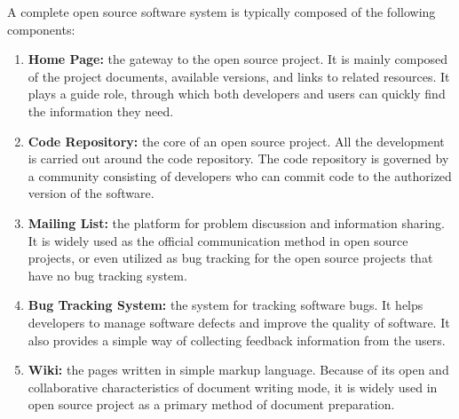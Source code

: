 \documentclass[draftclsnofoot,journal,onecolumn,12pt]{IEEEtran}
\begin{document}
%
A complete open source software system is typically composed of the following components:
\begin{enumerate}
  \item \textbf{Home Page:} the gateway to the open source project. It is mainly composed of the project documents, available versions, and links to related resources. It plays a guide role, through which both developers and users can quickly find the information they need.
  \item \textbf{Code Repository:} the core of an open source project. All the development is carried out around the code repository. The code repository is governed by a community consisting of developers who can commit code to the authorized version of the software.
  \item \textbf{Mailing List:} the platform for problem discussion and information sharing. It is widely used as the official communication method in open source projects, or even utilized as bug tracking for the open source projects that have no bug tracking system.
  \item \textbf{Bug Tracking System:} the system for tracking software bugs. It helps developers to manage software defects and improve the quality of software. It also provides a simple way of collecting feedback information from the users.
  \item \textbf{Wiki:} the pages written in simple markup language. Because of its open and collaborative characteristics of document writing mode, it is widely used in open source project as a primary method of document preparation.
\end{enumerate}
\end{document}
